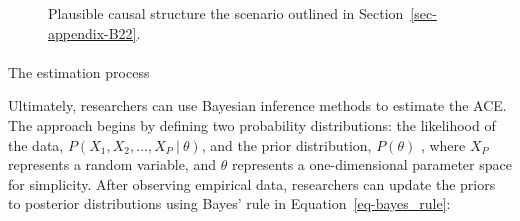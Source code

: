\documentclass[
  authoryear,
  review,
  1p]{elsarticle}
\makeatletter
\let\oldparagraph\paragraph
\renewcommand{\paragraph}{
    \@ifstar
      \xxxParagraphStar
      \xxxParagraphNoStar
  }
\newcommand{\xxxParagraphStar}[1]{\oldparagraph*{#1}\mbox{}}
\newcommand{\xxxParagraphNoStar}[1]{\oldparagraph{#1}\mbox{}}
\makeatother
\begin{document}
\begin{figure}

\begin{minipage}{0.50\linewidth}

\centering{

\[
\begin{aligned}
  X & := f_{X}(e_{X}) \\
  T & := t \\
  Y & := f_{Y}(t,X,e_{Y}) \\
  e_{T} & \:\bot\:e_{X} \\
  e_{T} & \:\bot\:e_{Y} \\
  e_{X} & \:\bot\:e_{Y}
\end{aligned}
\]

}


\end{minipage}%
%
\begin{minipage}{0.50\linewidth}



\end{minipage}%

\caption{\label{fig-example3}Plausible causal structure the scenario
outlined in Section~\ref{sec-appendix-B22}.}

\end{figure}%

\paragraph{The estimation process}\label{sec-appendix-C}

Ultimately, researchers can use Bayesian inference methods to estimate
the ACE. The approach begins by defining two probability distributions:
the likelihood of the data,
\(P(X_{1}, X_{2}, \dots, X_{P} \:|\:\theta)\), and the prior
distribution, \(P(\theta)\) \citep{Everitt_et_al_2010}, where \(X_{P}\)
represents a random variable, and \(\theta\) represents a
one-dimensional parameter space for simplicity. After observing
empirical data, researchers can update the priors to posterior
distributions using Bayes' rule in Equation~\ref{eq-bayes_rule}:
\end{document}
